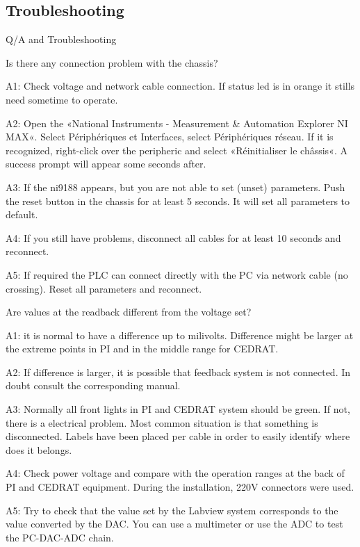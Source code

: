 \subsection{Troubleshooting}
Q/A and Troubleshooting\par 
Is there any connection problem with the chassis?\par 
A1: Check voltage and network cable connection. If status led is in orange it stills need sometime to operate.\par 
A2: Open the «National Instruments - Measurement \& Automation Explorer NI MAX«. Select Périphériques et Interfaces, select Périphériques réseau. If it is recognized, right-click over the peripheric and select «Réinitialiser le châssis«. A success prompt will appear some seconds after.\par 
A3: If the ni9188 appears, but you are not able to set (unset) parameters. Push the reset button in the chassis for at least 5 seconds. It will set all parameters to default.\par 
A4: If you still have problems, disconnect all cables for at least 10 seconds and reconnect.\par 
A5: If required the PLC can connect directly with the PC via network cable (no crossing). Reset all parameters and reconnect.\par 

Are values at the readback different from the voltage set?\par 
A1: it is normal to have a difference up to milivolts. Difference might be larger at the extreme points in PI and in the middle range for CEDRAT.\par 
A2: If difference is larger, it is possible that feedback system is not connected. In doubt  consult the corresponding manual.\par 
A3: Normally all front lights in PI and CEDRAT system should be green. If not, there is a electrical problem. Most common situation is that something is disconnected. Labels have been placed per cable in order to easily identify where does it belongs.\par 
A4: Check power voltage and compare with the operation ranges at the back of PI and CEDRAT equipment. During the installation, 220V connectors were used.\par 
A5: Try to check that the value set by the Labview system corresponds to the value converted by the DAC. You can use a multimeter or use the ADC to test the PC-DAC-ADC chain.\par 

